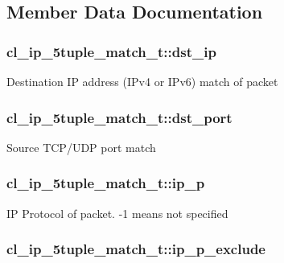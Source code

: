 \subsection{Member Data Documentation}
\hypertarget{structcl__ip__5tuple__match__t_ae64911318dd2c0b8bd78a66cee70e6ee}{
\subsubsection[{dst\-\_\-ip}]{ cl\-\_\-ip\-\_\-5tuple\-\_\-match\-\_\-t\-::dst\-\_\-ip}}\label{structcl__ip__5tuple__match__t_ae64911318dd2c0b8bd78a66cee70e6ee}
Destination I\-P address (I\-Pv4 or I\-Pv6) match of packet \hypertarget{structcl__ip__5tuple__match__t_a0fe61ca8c96e29c5da6add2108fc4762}{
\subsubsection[{dst\-\_\-port}]{ cl\-\_\-ip\-\_\-5tuple\-\_\-match\-\_\-t\-::dst\-\_\-port}}\label{structcl__ip__5tuple__match__t_a0fe61ca8c96e29c5da6add2108fc4762}
Source T\-C\-P/\-U\-D\-P port match \hypertarget{structcl__ip__5tuple__match__t_a5447664eb7486da5424d6022f31a6212}{
\subsubsection[{ip\-\_\-p}]{ cl\-\_\-ip\-\_\-5tuple\-\_\-match\-\_\-t\-::ip\-\_\-p}}\label{structcl__ip__5tuple__match__t_a5447664eb7486da5424d6022f31a6212}
I\-P Protocol of packet. -\/1 means not specified \hypertarget{structcl__ip__5tuple__match__t_aa22d6ac44d06a368be8a3d6aebea9380}{
\subsubsection[{ip\-\_\-p\-\_\-exclude}]{ cl\-\_\-ip\-\_\-5tuple\-\_\-match\-\_\-t\-::ip\-\_\-p\-\_\-exclude}}\label{structcl__ip__5tuple__match__t_aa22d6ac44d06a368be8a3d6aebea9380}
